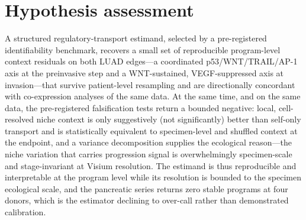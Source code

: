 \section{Hypothesis assessment}
\label{sec:hypothesis-assessment}

A structured regulatory-transport estimand, selected by a pre-registered identifiability benchmark, recovers a small set of reproducible program-level context residuals on both LUAD edges---a coordinated p53/WNT/TRAIL/AP-1 axis at the preinvasive step and a WNT-sustained, VEGF-suppressed axis at invasion---that survive patient-level resampling and are directionally concordant with co-expression analyses of the same data. At the same time, and on the same data, the pre-registered falsification tests return a bounded negative: local, cell-resolved niche context is only suggestively (not significantly) better than self-only transport and is statistically equivalent to specimen-level and shuffled context at the endpoint, and a variance decomposition supplies the ecological reason---the niche variation that carries progression signal is overwhelmingly specimen-scale and stage-invariant at Visium resolution. The estimand is thus reproducible and interpretable at the program level while its resolution is bounded to the specimen ecological scale, and the pancreatic series returns zero stable programs at four donors, which is the estimator declining to over-call rather than demonstrated calibration.

